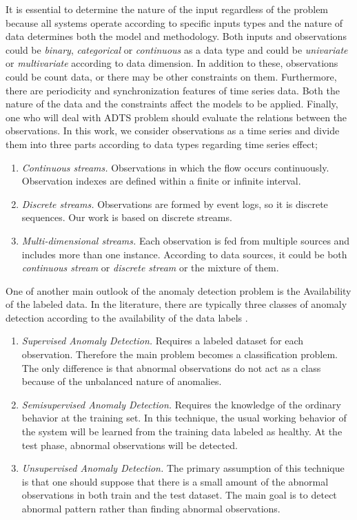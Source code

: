 It is essential to determine the nature of the input regardless of the problem because all systems operate according to specific inputs types and the nature of data determines both the model and methodology. 
Both inputs and observations could be {\it binary}, {\it categorical} or {\it continuous} as a data type and could be {\it univariate} or {\it multivariate} according to data dimension. 
In addition to these, observations could be count data, or there may be other constraints on them.
Furthermore, there are periodicity and synchronization features of time series data. 
Both the nature of the data and the constraints affect the models to be applied.
Finally, one who will deal with ADTS problem should evaluate the relations between the observations\cite{tan2018introduction}.
In this work, we consider observations as a time series and divide them into three parts according to data types regarding time series effect;

\begin{enumerate}
    \item {\it Continuous streams.} Observations in which the flow occurs continuously.
    Observation indexes are defined within a finite or infinite interval.
    \item {\it Discrete streams.} Observations are formed by event logs, so it is discrete sequences. Our work is based on discrete streams.
    \item {\it Multi-dimensional streams.} Each observation is fed from multiple sources and includes more than one instance. According to data sources, it could be both {\it continuous stream} or {\it discrete stream} or the mixture of them.
\end{enumerate}

One of another main outlook of the anomaly detection problem is the Availability of the labeled data.
In the literature, there are typically three classes of anomaly detection according to the availability of the data labels \cite{chandola2009anomaly}.

\begin{enumerate}
     \item {\it Supervised Anomaly Detection.} 
     Requires a labeled dataset for each observation. 
     Therefore the main problem becomes a classification problem. 
     The only difference is that abnormal observations do not act as a class because of the unbalanced nature of anomalies.
     
     \item {\it Semisupervised Anomaly Detection.} 
     Requires the knowledge of the ordinary behavior at the training set. 
     In this technique, the usual working behavior of the system will be learned from the training data labeled as healthy. 
     At the test phase, abnormal observations will be detected.
     
     \item {\it Unsupervised Anomaly Detection.} 
     The primary assumption of this technique is that one should suppose that there is a small amount of the abnormal observations in both train and the test dataset. 
     The main goal is to detect abnormal pattern rather than finding abnormal observations.
\end{enumerate}

